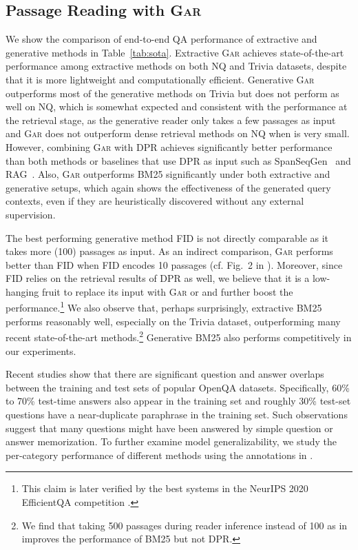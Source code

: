 \documentclass[11pt,a4paper]{article}
\newcommand{\ours}{\textsc{Gar}\xspace}
\newcommand{\oursPlus}{\xspace}
\begin{document}
\subsection{Passage Reading with \ours}
\label{sec:exp_read}


We show the comparison of end-to-end QA performance of extractive and generative methods in Table~\ref{tab:sota}.
Extractive \ours achieves state-of-the-art performance among extractive methods on both NQ and Trivia datasets, despite that it is more lightweight and computationally efficient.
Generative \ours outperforms most of the generative methods on Trivia but does not perform as well on NQ, which is somewhat expected and consistent with the performance at the retrieval stage, as the generative reader only takes a few passages as input and \ours does not outperform dense retrieval methods on NQ when  is very small.
However, combining \ours with DPR achieves significantly better performance than both methods or baselines that use DPR as input such as SpanSeqGen~\citep{min2020ambigqa} and RAG~\citep{lewis2020retrieval}.
Also, \ours outperforms BM25 significantly under both extractive and generative setups, which again shows the effectiveness of the generated query contexts, even if they are heuristically discovered without any external supervision.

The best performing generative method FID \cite{izacard2020leveraging} is not directly comparable as it takes more (100) passages as input. As an indirect comparison, \ours performs better than FID when FID encodes 10 passages (cf. Fig.~2 in \citet{izacard2020leveraging}).
Moreover, since FID relies on the retrieval results of DPR as well, we believe that it is a low-hanging fruit to replace its input with \ours or \oursPlus and further boost the performance.\footnote{This claim is later verified by the best systems in the NeurIPS 2020 EfficientQA competition \cite{min2021neurips}.}
We also observe that, perhaps surprisingly, extractive BM25 performs reasonably well, especially on the Trivia dataset, outperforming many recent state-of-the-art methods.\footnote{We find that taking 500 passages during reader inference instead of 100 as in \citet{karpukhin2020dense} improves the performance of BM25 but not DPR.} Generative BM25 also performs competitively in our experiments.




Recent studies \cite{lewis2020question} show that there are significant question and answer overlaps between the training and test sets of popular OpenQA datasets.
Specifically, 60\% to 70\% test-time answers also appear in the training set and roughly 30\% test-set questions have a near-duplicate paraphrase in the training set. Such observations suggest that many questions might have been answered by simple question or answer memorization.
To further examine model generalizability, we study the per-category performance of different methods using the annotations in \citet{lewis2020question}.
\end{document}
